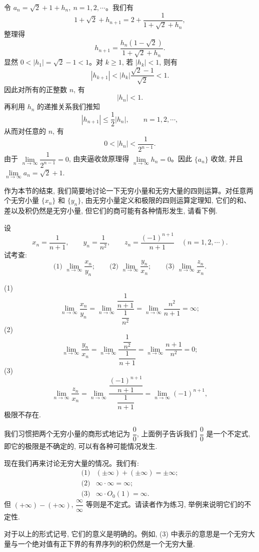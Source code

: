 \begin{solve}
令 $a_n=\sqrt2+1+h_n,\ n=1,2,\cdots$。我们有
\[
  1+\sqrt2+h_{n+1}=2+\frac1{1+\sqrt2+h_n},
\]
整理得
\[
  h_{n+1}=\frac{h_n(1-\sqrt2)}{1+\sqrt2+h_n}.
\]
显然 $0<|h_1|=\sqrt2-1<1$。对 $k\geqslant1$, 若 $|h_k|<1$, 则有
\[
  |h_{k+1}|<|h_k|\frac{\sqrt2-1}{\sqrt2}<1.
\]
因此对所有的正整数 $n$, 有
\[
  |h_n|<1.
\]
再利用 $h_n$ 的递推关系我们推知
\[
  |h_{n+1}|\leqslant\frac12|h_n|,\qquad n=1,2,\cdots,
\]
从而对任意的 $n$, 有
\[
  0<|h_n|<\frac1{2^{n-1}}.
\]
由于 $\lim\limits_{n\to\infty}\dfrac1{2^{n-1}}=0$, 由夹逼收敛原理得 $\lim\limits_{n\to\infty}h_n=0$。因此 $\{a_n\}$ 收敛, 并且 $\lim\limits_{n\to\infty}a_n=\sqrt2+1$.

作为本节的结束, 我们简要地讨论一下无穷小量和无穷大量的四则运算。对任意两个无穷小量 $\{x_n\}$ 和 $\{y_n\}$, 由无穷小量定义和极限的四则运算定理知, 它们的和、差以及积仍然是无穷小量, 但它们的商可能有各种情形发生, 请看下例.
\end{solve}


\begin{example}\label{example:ma-2-2-5}
设
\[
  x_n=\frac1{n+1},\qquad y_n=\frac1{n^2},\qquad z_n=\frac{(-1)^{n+1}}{n+1}\quad(n=1,2,\cdots).
\]
试考查:
\[
  \text{(1) }\lim_{n\to\infty}\frac{x_n}{y_n};\qquad
  \text{(2) }\lim_{n\to\infty}\frac{y_n}{x_n};\qquad
  \text{(3) }\lim_{n\to\infty}\frac{z_n}{x_n}.
\]
\end{example}


\begin{solve}
(1)
\[
  \lim_{n\to\infty}\frac{x_n}{y_n}
  =
  \lim_{n\to\infty}\frac{\dfrac1{n+1}}{\dfrac1{n^2}}
  =
  \lim_{n\to\infty}\frac{n^2}{n+1}
  =
  \infty;
\]
(2)
\[
  \lim_{n\to\infty}\frac{y_n}{x_n}
  =
  \lim_{n\to\infty}\frac{\dfrac1{n^2}}{\dfrac1{n+1}}
  =
  \lim_{n\to\infty}\frac{n+1}{n^2}
  =
  0;
\]
(3)
\[
  \lim_{n\to\infty}\frac{z_n}{x_n}
  =
  \lim_{n\to\infty}\frac{\dfrac{(-1)^{n+1}}{n+1}}{\dfrac1{n+1}}
  =
  \lim_{n\to\infty}(-1)^{n+1},
\]
极限不存在.

我们习惯把两个无穷小量的商形式地记为 $\dfrac00$, 上面例子告诉我们 $\dfrac00$ 是一个不定式, 即它的极限是不确定的, 可以有各种可能情况发生.

现在我们再来讨论无穷大量的情况。我们有:
\[
\begin{array}{ll}
  \text{(1)} & (\pm\infty)+(\pm\infty)=\pm\infty;\\
  \text{(2)} & \infty\cdot\infty=\infty;\\
  \text{(3)} & \infty\cdot O_0(1)=\infty.
\end{array}
\]
但 $(+\infty)-(+\infty)$, $\dfrac{\infty}{\infty}$ 等则是不定式。请读者作为练习, 举例来说明它们的不定性.

对于以上的形式记号, 它们的意义是明确的。例如, (3) 中表示的意思是一个无穷大量与一个绝对值有正下界的有界序列的积仍然是一个无穷大量.
\end{solve}



